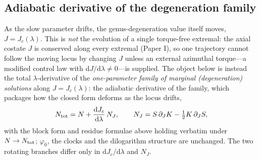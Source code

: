 \documentclass[12pt]{iopart}
\theoremstyle{plain}
\theoremstyle{definition}
\theoremstyle{remark}
\newcommand{\Jc}{J_{c}}
\newcommand{\dd}{\mathrm{d}}
\begin{document}
\subsection{Adiabatic derivative of the degeneration family}
\label{app:tracking}
As the slow parameter drifts, the genus-degeneration value itself moves,
$J=\Jc(\lambda)$. This is \emph{not} the evolution of a single torque-free extremal:
the axial costate $J$ is conserved along every extremal
(Paper I), so one trajectory cannot follow the moving locus by
changing $J$ unless an external azimuthal torque---a modified control law with
$\dd J/\dd\lambda\neq0$---is supplied. The object below is instead the total
$\lambda$-derivative of the \emph{one-parameter family of marginal (degeneration)
solutions} along $J=\Jc(\lambda)$: the adiabatic derivative of the family, which
packages how the closed form deforms as the locus drifts,
\begin{equation}
N_{\rm tot}=N+\frac{\dd\Jc}{\dd\lambda}\,N_J,\qquad
N_J=S\,\partial_JK-\tfrac12K\,\partial_JS,
\label{eq:Ntot-track}
\end{equation}
with the block form and residue formulae above holding verbatim under $N\to N_{\rm tot}$;
$\varphi_0$, the clocks and the dilogarithm structure are unchanged. The two rotating
branches differ only in $\dd\Jc/\dd\lambda$ and $N_J$.
\end{document}
